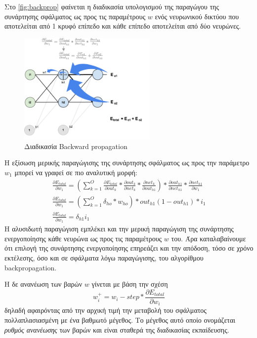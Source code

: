 Στο \autoref{fig:backprop} φαίνεται η διαδικασία υπολογισμού της παραγώγου της συνάρτησης
σφάλματος ως προς τις παραμέτρους $w$
ενός νευρωνικού δικτύου που αποτελείται από 1 κρυφό επίπεδο και κάθε επίπεδο
αποτελείται από δύο νευρώνες.

\begin{figure}[!ht]
  \centering
  \hspace*{2cm}
  \includegraphics[width=0.6\textwidth]{./images/chapter3/backprop.png}
  \caption[Διαδικασία Backward propagation]{Διαδικασία Backward propagation}
  \label{fig:backprop}
\end{figure}

Η εξίσωση μερικής παραγώγισης της συνάρτησης σφάλματος ως προς την παράμετρο
$w_{1}$ μπορεί να γραφεί σε πιο αναλυτική μορφή:
\begin{gather*}
  \frac{\partial E_{total}}{\partial w_{1}} = (\sum_{k=1}^{O}\frac{\partial E_{total}}{\partial out_{k}}*\frac{\partial out_{k}}{\partial net_{k}}*\frac{\partial net_{k}}{\partial out_{h1}})*\frac{\partial out_{h1}}{\partial net_{h1}}*\frac{\partial net_{h1}}{\partial w_{1}} \\
  \frac{\partial E_{total}}{\partial w_{1}} = (\sum_{k=1}^{O}\delta_{ho}*w_{ho}) * out_{h1}(1-out_{h1}) * i_{1} \\
  \frac{\partial E_{total}}{\partial w_{1}} = \delta_{h1}i_{1}
\end{gather*}
Η αλυσιδωτή παραγώγιση εμπλέκει και την μερική παραγώγιση της
συνάρτησης ενεργοποίησης κάθε νευρώνα ως προς τις παραμέτρους $w$ του.
Άρα καταλαβαίνουμε ότι επιλογή της
συνάρτησης ενεργοποίησης επηρεάζει και την απόδοση, τόσο σε χρόνο εκτέλεσης,
όσο και σε σφάλματα λόγω παραγώγισης, του αλγορίθμου backpropagation.

Η δε ανανέωση των βαρών $w$ γίνεται με βάση την σχέση
\begin{equation*}
  w_{i}^{+} = w_{i} - step * \frac{\partial E_{total}}{\partial w_{i}}
\end{equation*}
δηλαδή αφαιρόντας από την αρχική τιμή την μεταβολή του σφάλματος πολλαπλασιασμένη
με ένα βαθμωτό μέγεθος. Το μέγεθος αυτό οποίο ονομάζεται \emph{ρυθμός ανανέωσης}
των βαρών και είναι σταθερά της διαδικασίας εκπαίδευσης.

